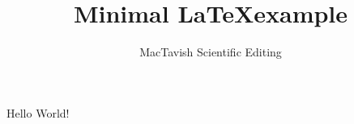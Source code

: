 \documentclass{article}
\begin{document}
\title{Minimal \LaTeX example}
\author{MacTavish Scientific Editing}
\maketitle

Hello World!
\end{document}
